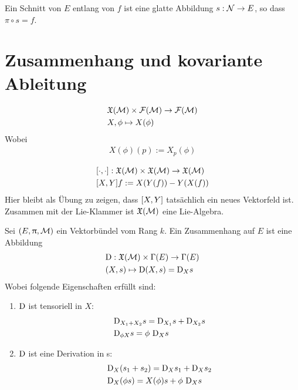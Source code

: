 \begin{defs}
Ein Schnitt von $E$ entlang von $f$ ist eine glatte Abbildung $s : \mathcal{N} \to E$, so dass $\pi \circ s = f$. 
\end{defs}

\section{Zusammenhang und kovariante Ableitung}

\begin{defs}
\begin{align}
&\mathfrak{X}(\mathcal{M}) \times \mathcal{F}(\mathcal{M}) \to \mathcal{F}(\mathcal{M})\\
&X, \phi \mapsto X(\phi)
\end{align}
Wobei
\begin{align}
X(\phi)(p):= X_p (\phi)
\end{align}
\end{defs}


\begin{defs}
\begin{align}
&\comm{\cdot}{\cdot} : \mathfrak{X}(\mfk) \times \mathfrak{X}(\mfk) \to \mathfrak{X}(\mfk)\\
&\comm{X}{Y} f := X(Y(f)) - Y(X(f))
\end{align}
Hier bleibt als Übung zu zeigen, dass $\comm{X}{Y}$ tatsächlich ein neues Vektorfeld ist.\\
Zusammen mit der Lie-Klammer ist $\mathfrak{X}(\mathcal{M})$ eine Lie-Algebra.
\end{defs}

\begin{defs}[Zusammenhang]
Sei $(E, \uppi, \mathcal{M})$ ein Vektorbündel vom Rang $k$.
Ein Zusammenhang auf $E$ ist eine Abbildung
\begin{align}
&\mathrm{D} : \mathfrak{X}(\mathcal{M}) \times \Gamma(E) \to \Gamma (E) \\
&(X, s) \mapsto \mathrm{D} (X, s) = \mathrm{D}_X s
\end{align}
Wobei folgende Eigenschaften erfüllt sind:
\begin{enumerate}
\item $\mathrm{D}$ ist tensoriell in $X$: 
\begin{align}
&\mathrm{D}_{X_1 + X_2} s = \mathrm{D}_{X_1} s + \mathrm{D}_{X_2} s \\
&\mathrm{D}_{\phi X} s = \phi \ \mathrm{D}_X s
\end{align}
\item $\mathrm{D}$ ist eine Derivation in s:
\begin{align}
&\mathrm{D}_X (s_1 + s_2) = \mathrm{D}_X s_1 + \mathrm{D}_X s_2\\
&\mathrm{D}_X (\phi s) = X (\phi) s + \phi \ \mathrm{D}_X  s
\end{align}
\end{enumerate}
\end{defs}

